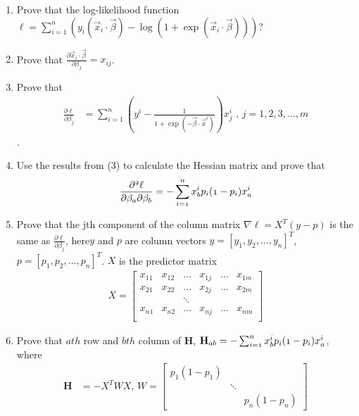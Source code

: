 \documentclass{article}
\begin{document}
\begin{enumerate}
\item Prove that the log-likelihood function $\ell=\sum\limits_{i=1}^n \left( y_i (\vec{x}_i \cdot \vec{\beta})-\log (1+\exp({\vec{x}_i \cdot \vec{\beta}}))\right)$?
\item Prove that $\frac{\partial \vec{x}_i \cdot \vec{\beta}}{\partial \beta_j}=x_{ij} $. 
\item  Prove that \begin{align*}
{\frac{\partial\ell}{\partial\beta_j}}
&={\sum_{i=1}^{n}\left (y^i-\frac{1}{1+\exp(-\vec{\beta}\cdot\vec{x}^i)} \right) x_{j}^{i}} \text{ , } {j=1, 2, 3, ...,m}
\end{align*}.
\item Use the results from (3) to calculate the Hessian matrix and prove that 
\begin{align*}
\mathnormal{\frac{\partial^2\ell}{\partial\beta_a\partial\beta_b}}=\mathnormal{-\sum_{i=1}^{n}x_b^i p_i (1-p_i)x_a^i}\\
\end{align*}
\item Prove that the jth component of the column matrix $\nabla\ell={X}^T(y-p)$ is the same as ${\frac{\partial\ell}{\partial\beta_j}}$, here$y$ and $p$ are column vectors $y=[y_1, y_2, ..., y_n]^T$, $p=[p_1, p_2, ..., p_n]^T$. $X$ is the predictor matrix 
\begin{align*}
{X}=  \begin{bmatrix}
    {x_{11}} & x_{12} &\dots &x_{1j}  &\dots &x_{1m} \\
    {x_{21}} & x_{22} &\dots &x_{2j}  &\dots &x_{2m} \\
    & & \ddots & &\\
    {x_{n1}} & x_{n2} &\dots &x_{nj}  &\dots &x_{nm} \\
  \end{bmatrix}
\end{align*}

\item Prove that $ath$ row and $bth$ column of $\mathbf{H}$, $\mathbf{H}_{ab}=\mathnormal{-\sum_{i=1}^{n}x_b^i p_i (1-p_i)x_a^i}$, where
\begin{align*}
\mathbf{H}&={-X^TWX}\text{, } 
{W}=  \begin{bmatrix}
    {p_1 (1-p_1)} & & \\
    & \ddots & \\
    & & {p_n (1-p_n)}
  \end{bmatrix}
\end{align*}
\end{enumerate}
\end{document}

